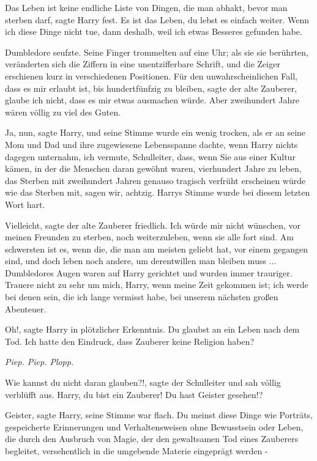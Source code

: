 \glqq{}Das Leben ist keine endliche Liste von Dingen, die man abhakt, bevor man
sterben darf\grqq{}, sagte Harry fest. \glqq{}Es ist das Leben, du lebst es
einfach weiter. Wenn ich diese Dinge nicht tue, dann deshalb, weil ich etwas
Besseres gefunden habe.\grqq{}

Dumbledore seufzte. Seine Finger trommelten auf eine Uhr; als sie sie berührten,
veränderten sich die Ziffern in eine unentzifferbare Schrift, und die Zeiger
erschienen kurz in verschiedenen Positionen. \glqq{}Für den unwahrscheinlichen
Fall, dass es mir erlaubt ist, bis hundertfünfzig zu bleiben\grqq{}, sagte der
alte Zauberer, \glqq{}glaube ich nicht, dass es mir etwas ausmachen würde. Aber
zweihundert Jahre wären völlig zu viel des Guten.\grqq{}

\glqq{}Ja, nun\grqq{}, sagte Harry, und seine Stimme wurde ein wenig trocken, als
er an seine Mom und Dad und ihre zugewiesene Lebensspanne dachte, wenn Harry
nichts dagegen unternahm, \glqq{}ich vermute, Schulleiter, dass, wenn Sie aus
einer Kultur kämen, in der die Menschen daran gewöhnt waren, vierhundert Jahre
zu leben, das Sterben mit zweihundert Jahren genauso tragisch verfrüht
erscheinen würde wie das Sterben mit, sagen wir,\emph{} achtzig.\grqq{} Harrys
Stimme wurde bei diesem letzten Wort hart.

\glqq{}Vielleicht\grqq{}, sagte der alte Zauberer friedlich. \glqq{}Ich würde mir
nicht wünschen, vor meinen Freunden zu sterben, noch weiterzuleben, wenn sie
alle fort sind. Am schwersten ist es, wenn die, die man am meisten geliebt hat,
vor einem gegangen sind, und doch leben noch andere, um derentwillen man bleiben
muss ...\grqq{} Dumbledores Augen waren auf Harry gerichtet und wurden immer
trauriger. \glqq{}Trauere nicht zu sehr um mich, Harry, wenn meine Zeit gekommen
ist; ich werde bei denen sein, die ich lange vermisst habe, bei unserem nächsten
großen Abenteuer.\grqq{}

\glqq{}Oh!\grqq{}, sagte Harry in plötzlicher Erkenntnis. \glqq{}Du glaubst an ein
Leben nach dem Tod. Ich hatte den Eindruck, dass Zauberer keine Religion
haben?\grqq{}

\emph{Piep. Piep. Plopp.}

\glqq{}Wie kannst du nicht daran glauben?!\grqq{}, sagte der Schulleiter und sah
völlig verblüfft aus. \glqq{}Harry, du bist ein Zauberer! Du hast Geister
gesehen!?\grqq{}

\glqq{}Geister\grqq{}, sagte Harry, seine Stimme war flach. \glqq{}Du meinst diese
Dinge wie Porträts, gespeicherte Erinnerungen und Verhaltensweisen ohne
Bewusstsein oder Leben, die durch den Ausbruch von Magie, der den gewaltsamen
Tod eines Zauberers begleitet, versehentlich in die umgebende Materie eingeprägt
werden -\grqq{}

